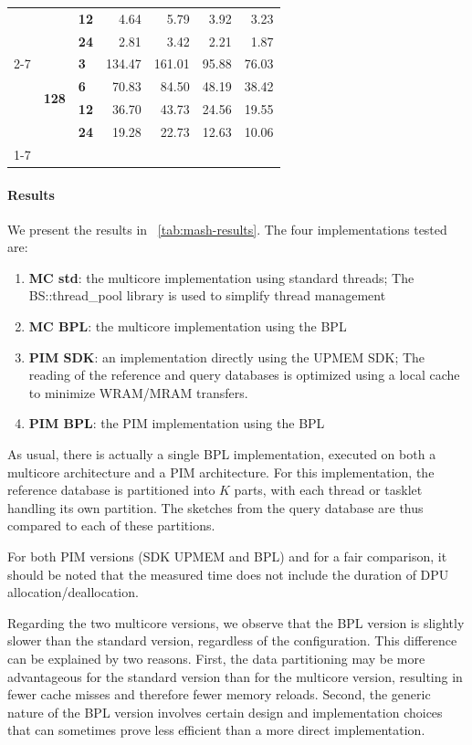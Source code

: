 \begin{table}
\begin{tabular}{lll|rr|rr}
\textbf{} & \textbf{} & \textbf{12} & 4.64 & 5.79 & 3.92 & 3.23 \\
\textbf{} & \textbf{} & \textbf{24} & 2.81 & 3.42 & 2.21 & 1.87 \\
\cline{2-7}
\textbf{} & \multirow[t]{4}{*}{\textbf{128}} & \textbf{3} & 134.47 & 161.01 & 95.88 & 76.03 \\
\textbf{} & \textbf{} & \textbf{6} & 70.83 & 84.50 & 48.19 & 38.42 \\
\textbf{} & \textbf{} & \textbf{12} & 36.70 & 43.73 & 24.56 & 19.55 \\
\textbf{} & \textbf{} & \textbf{24} & 19.28 & 22.73 & 12.63 & 10.06 \\
\cline{1-7} \cline{2-7}
\bottomrule
\end{tabular}
\end{table}


\paragraph{Results} We present the results in \tablename~\ref{tab:mash-results}. The four implementations tested are:
\begin{enumerate}
\item \textbf{MC std}: the multicore implementation using standard threads; The {BS::thread\_pool} library is used to simplify thread management
\item \textbf{MC BPL}: the multicore implementation using the BPL
\item \textbf{PIM SDK}: an implementation directly using the UPMEM SDK; The reading of the reference and query databases is optimized using a local cache to minimize WRAM/MRAM transfers.
\item \textbf{PIM BPL}: the PIM implementation using the BPL
\end{enumerate}

As usual, there is actually a single BPL implementation, executed on both a multicore architecture and a PIM architecture. 
For this implementation, the reference database is partitioned into $K$ parts, with each thread or tasklet handling its own partition. The sketches from the query database are thus compared to each of these partitions.

For both PIM versions (SDK UPMEM and BPL) and for a fair comparison, it should be noted that the measured time does not include the duration of DPU allocation/deallocation.

Regarding the two multicore versions, we observe that the BPL version is slightly slower than the standard version, regardless of the configuration. This difference can be explained by two reasons. First, the data partitioning may be more advantageous for the standard version than for the multicore version, resulting in fewer cache misses and therefore fewer memory reloads. Second, the generic nature of the BPL version involves certain design and implementation choices that can sometimes prove less efficient than a more direct implementation.

